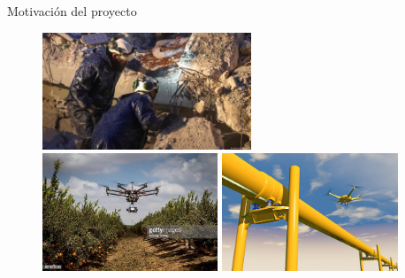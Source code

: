 \documentclass[24pt,aspectratio=169]{beamer}
\begin{document}
\begin{frame}[fragile]{Motivación del proyecto}
  \begin{figure}[ht!]
    \centering
    \begin{minipage}{0.48\textwidth}
      \centering
      \includegraphics[width=\linewidth,height=3.5cm]{turquia1.jpg} %
    \end{minipage}\hfill
    \begin{minipage}{0.48\textwidth}
      \centering
      \includegraphics[width=\linewidth,height=3.5cm]{drone_agriculture.jpg} %
    \end{minipage}
    \vspace{-0.2cm} %
    \begin{minipage}{0.48\textwidth}
      \centering
      \includegraphics[width=\linewidth,height=3.5cm]{pipe_drone.jpg} %

\end{minipage}
\end{figure}
\end{frame}
\end{document}
